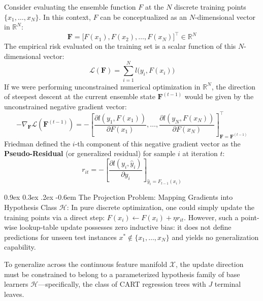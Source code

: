 \documentclass[11pt,a4paper]{article}
\makeatletter
\renewcommand\paragraph{\@startsection{paragraph}{4}{\z@}%
                                     {0.9ex \@plus0.3ex \@minus.2ex}%
                                     {-0.6em}%
                                     {\normalfont\normalsize\bfseries}}
\newcommand{\R}{\mathbb{R}}
\makeatother
\begin{document}
Consider evaluating the ensemble function $F$ at the $N$ discrete training points $\{x_1, \dots, x_N\}$. In this context, $F$ can be conceptualized as an $N$-dimensional vector in $\R^N$:
\begin{equation}
    \mathbf{F} = \big[ F(x_1), F(x_2), \dots, F(x_N) \big]^\top \in \R^N
\end{equation}
The empirical risk evaluated on the training set is a scalar function of this $N$-dimensional vector:
\begin{equation}
    \mathcal{L}(\mathbf{F}) = \sum_{i=1}^N l\big(y_i, F(x_i)\big)
\end{equation}
If we were performing unconstrained numerical optimization in $\R^N$, the direction of steepest descent at the current ensemble state $\mathbf{F}^{(t-1)}$ would be given by the unconstrained negative gradient vector:
\begin{equation}
    -\nabla_{\mathbf{F}} \mathcal{L}(\mathbf{F}^{(t-1)}) = - \left[ \frac{\partial l(y_1, F(x_1))}{\partial F(x_1)}, \dots, \frac{\partial l(y_N, F(x_N))}{\partial F(x_N)} \right]^\top_{\mathbf{F} = \mathbf{F}^{(t-1)}}
\end{equation}
Friedman defined the $i$-th component of this negative gradient vector as the \textbf{Pseudo-Residual} (or generalized residual) for sample $i$ at iteration $t$:
\begin{equation}
    r_{it} = -\left[ \frac{\partial l(y_i, \hat{y}_i)}{\partial \hat{y}_i} \right]_{\hat{y}_i = F_{t-1}(x_i)}
\end{equation}

\paragraph{The Projection Problem: Mapping Gradients into Hypothesis Class $\mathcal{H}$:}
In pure discrete optimization, one could simply update the training points via a direct step: $F(x_i) \leftarrow F(x_i) + \eta r_{it}$. However, such a point-wise lookup-table update possesses zero inductive bias: it does not define predictions for unseen test instances $x^* \notin \{x_1, \dots, x_N\}$ and yields no generalization capability.

To generalize across the continuous feature manifold $\mathcal{X}$, the update direction must be constrained to belong to a parameterized hypothesis family of base learners $\mathcal{H}$---specifically, the class of CART regression trees with $J$ terminal leaves.
\end{document}
